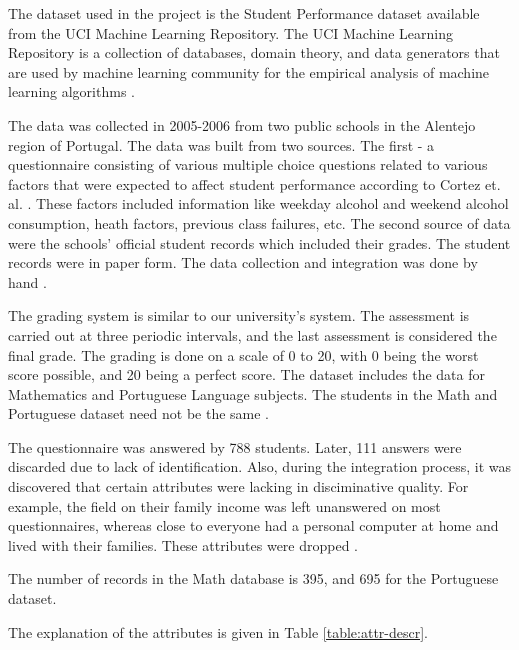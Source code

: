 \documentclass[conference]{IEEEtran}
\begin{document}
The dataset used in the project is the Student Performance dataset available from the UCI 
Machine Learning Repository. The UCI Machine Learning Repository is a collection of databases, 
domain theory, and data generators that are used by machine learning community for the empirical 
analysis of machine learning algorithms \cite{Lichman:2013}.

The data was collected in 2005-2006 from two public schools in the Alentejo region of Portugal. 
The data was built from two sources. The first - a questionnaire consisting of various multiple choice 
questions related to various factors that were expected to affect student performance according 
to Cortez et. al. \cite{ref:4}. These factors included information like weekday alcohol and 
weekend alcohol consumption, heath factors, previous class failures, etc. The second source of 
data were the schools' official student records which included their grades. The student records 
were in paper form. The data collection and integration was done by hand \cite{ref:4}.

The grading system is similar to our university's system. The assessment is carried out at three 
periodic intervals, and the last assessment is considered the final grade. The grading is done on a scale 
of 0 to 20, with 0 being the worst score possible, and 20 being a perfect score. The dataset includes 
the data for Mathematics and Portuguese Language subjects. The students in the Math and Portuguese dataset 
need not be the same \cite{ref:4}.

The questionnaire was answered by 788 students. Later, 111 answers were discarded due to lack of identification. 
Also, during the integration process, it was discovered that certain attributes were lacking in disciminative 
quality. For example, the field on their family income was left unanswered on most questionnaires, whereas close 
to everyone had a personal computer at home and lived with their families. These attributes were dropped \cite{ref:4}.

The number of records in the Math database is 395, and 695 for the Portuguese dataset.

The explanation of the attributes is given in Table \ref{table:attr-descr}.
\end{document}
